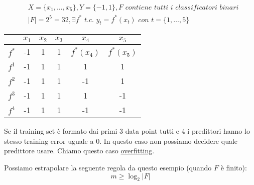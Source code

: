\documentclass{article}
\begin{document}
\begin{displaymath}
	\begin{split}
		&X= \{ x_1,\dots, x_5 \}, Y= \{ -1,1 \}, F \textit{ contiene tutti i classificatori binari} \\
		&|F|=2^5=32, \exists f^* \textit{ t.c. } y_t=f^*(x_t) \textit{ con } t=\{ 1,\dots, 5 \}
	\end{split}
\end{displaymath}
\begin{table}[]
\begin{tabular}{l|ccccc}
\cline{2-6}
                            & \multicolumn{1}{c|}{$x_1$} & \multicolumn{1}{c|}{$x_2$} & \multicolumn{1}{c|}{$x_3$} & \multicolumn{1}{c|}{$x_4$} & \multicolumn{1}{c|}{$x_5$} \\ \hline
\multicolumn{1}{|l|}{$f^*$} & -1                         & 1                          & 1                          & $f^*(x_4)$                 & $f^*(x_5)$                 \\ \cline{1-1}
\multicolumn{1}{|l|}{$f^1$} & -1                         & 1                          & 1                          & 1                          & 1                          \\ \cline{1-1}
\multicolumn{1}{|l|}{$f^2$} & -1                         & 1                          & 1                          & -1                         & 1                          \\ \cline{1-1}
\multicolumn{1}{|l|}{$f^3$} & -1                         & 1                          & 1                          & 1                          & -1                         \\ \cline{1-1}
\multicolumn{1}{|l|}{$f^4$} & -1                         & 1                          & 1                          & -1                         & -1                         \\ \cline{1-1}
\end{tabular}
\end{table}
Se il training set è formato dai primi 3 data point tutti e 4 i predittori hanno lo stesso training error uguale a 0. In questo caso non possiamo decidere quale predittore usare. Chiamo questo caso \underline{overfitting}.



Possiamo estrapolare la seguente regola da questo esempio (quando $F$ è finito):
\begin{displaymath}
	m \geq \log_2|F|
\end{displaymath}
\end{document}
